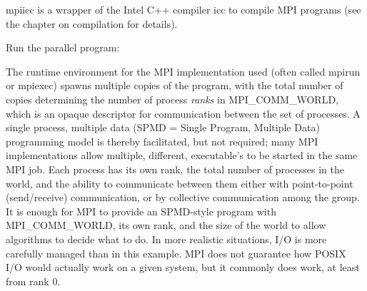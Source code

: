 mpiicc is a wrapper of the Intel C++ compiler icc to compile MPI programs (see the chapter on compilation for details).


Run the parallel program:


The runtime environment for the MPI implementation used (often called mpirun or mpiexec) spawns multiple copies of the program, with the total number of copies determining the number of process \textit{ranks} in MPI\_COMM\_WORLD, which is an opaque descriptor for communication between the set of processes. A single process, multiple data (SPMD = Single Program, Multiple Data) programming model is thereby facilitated, but not required; many MPI implementations allow multiple, different, executable's to be started in the same MPI job. Each process has its own rank, the total number of processes in the world, and the ability to communicate between them either with point-to-point (send/receive) communication, or by collective communication among the group. It is enough for MPI to provide an SPMD-style program with MPI\_COMM\_WORLD, its own rank, and the size of the world to allow algorithms to decide what to do. In more realistic situations, I/O is more carefully managed than in this example. MPI does not guarantee how POSIX I/O would actually work on a given system, but it commonly does work, at least from rank 0.

